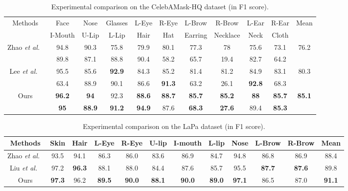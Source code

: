 \documentclass[runningheads]{llncs}
\def\et{{\it et al.~}}
\begin{document}
\begin{table}[t]
\caption{Experimental comparison on the CelebAMask-HQ dataset (in F1 score).}
\label{table:Celeb}
\begin{tabular}{c|ccccccccc|c}
\toprule
\multirow{2}{*}{Methods}  & Face    & Nose  & Glasses & L-Eye & R-Eye & L-Brow  & R-Brow   & L-Ear & R-Ear & \multirow{2}{*}{Mean} \\
                          & I-Mouth & U-Lip & L-Lip   & Hair  & Hat   & Earring & Necklace & Neck  & Cloth &                       \\
\midrule
\multirow{2}{*}{Zhao \et \cite{zhao2017pyramid}}   & 94.8    & 90.3  & 75.8    & 79.9  & 80.1  & 77.3    & 78       & 75.6  & 73.1  & \multirow{2}{*}{76.2} \\
                          & 89.8    & 87.1  & 88.8    & 90.4  & 58.2  & 65.7    & 19.4     & 82.7  & 64.2  &                       \\
\midrule
\multirow{2}{*}{Lee \et\cite{CelebAMask-HQ}} & 95.5    & 85.6  & \textbf{92.9}    & 84.3  & 85.2  & 81.4    & 81.2     & 84.9  & 83.1  & \multirow{2}{*}{80.3} \\
                          & 63.4    & 88.9  & 90.1    & 86.6  & \textbf{91.3}  & 63.2    & 26.1     & \textbf{92.8}  & 68.3  &                       \\
\midrule
\multirow{2}{*}{Ours}     & \textbf{96.2}    & \textbf{94}    & 92.3    & \textbf{88.6}  & \textbf{88.7}  & \textbf{85.7}    & \textbf{85.2}     & \textbf{88}    & \textbf{85.7}  & \multirow{2}{*}{\textbf{85.1}} \\
                          & \textbf{95}      & \textbf{88.9}  & \textbf{91.2}    & \textbf{94.9}  & 87.6  & \textbf{68.3}    & \textbf{27.6}     & 89.4  & \textbf{85.3}  &    \\  
                          
\bottomrule
\end{tabular}
\end{table}

\begin{table}[t]
\centering
\caption{Experimental comparison on the LaPa dataset (in F1 score).}
\label{table:LaPa}
\begin{tabular}{c|cccccccccc|c}
\toprule
Methods & Skin & Hair & L-Eye & R-Eye & U-lip & I-mouth & L-lip & Nose & L-Brow & R-Brow & Mean \\ 
\midrule
Zhao \et \cite{zhao2017pyramid} & 93.5 & 94.1 & 86.3 & 86.0 & 83.6 & 86.9 & 84.7 & 94.8 & 86.8 & 86.9  & 88.4 \\
Liu \et \cite{liu2020new} & 97.2 & \textbf{96.3} & 88.1 & 88.0 &  84.4 & 87.6 & 85.7 & 95.5 & \textbf{87.7} & \textbf{87.6}  & 89.8 \\
\midrule
Ours & \textbf{97.3} & 96.2 & \textbf{89.5} & \textbf{90.0} & \textbf{88.1} & \textbf{90.0} & \textbf{89.0} & \textbf{97.1} & 86.5 & 87.0 & \textbf{91.1} \\
\bottomrule
\end{tabular}
\end{table}
\end{document}
